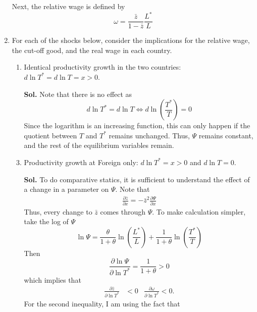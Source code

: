 \documentclass[12pt,oneside,reqno]{amsart}
\begin{document}
\begin{enumerate}[leftmargin=*]
\begin{equation}
    \end{equation}
    Next, the relative wage is defined by 
    \begin{equation}
        \omega = \frac{\bar{z}}{1-\bar{z}} \frac{L^*}{L}
    \end{equation}
    \item For each of the shocks below, consider the implications for the relative wage, the cut-off good, and the real wage in each country.
    \begin{enumerate}[leftmargin=*]
        \item Identical productivity growth in the two countries: $d \ln T^*=d \ln T=x>0$.
        \item[\textbf{Sol.}] Note that there is no effect as 
        \begin{equation*}
            d\ln T^*=d\ln T \Longleftrightarrow d\ln\left(\frac{T^*}{T}\right) = 0
        \end{equation*}
        Since the logarithm is an increasing function, this can only happen if the quotient between $T$ and $T^*$ remains unchanged. Thus, $\Psi$ remains constant, and the rest of the equilibrium variables remain.  
        \item Productivity growth at Foreign only: $d \ln T^*=x>0$ and $d \ln T=0$.
        \item[\textbf{Sol.}] To do comparative statics, it is sufficient to understand the effect of a change in a parameter on $\Psi$. Note that
        \begin{align*}
            \frac{\partial \bar{z}}{\partial x} = -\bar{z}^2\frac{\partial\Psi}{\partial x}
        \end{align*}
        Thus, every change to $\bar{z}$ comes through $\Psi$. To make calculation simpler, take the log of $\Psi$
        \begin{equation}\label{ps1:q1:lnPsi}
            \ln\Psi = \frac{\theta}{1+\theta}\ln\left(\frac{L^*}{L}\right) + \frac{1}{1+\theta}\ln\left(\frac{T^*}{T}\right)
        \end{equation}
        Then 
        \begin{equation*}
            \frac{\partial\ln\Psi}{\partial\ln T^*} = \frac{1}{1+\theta}>0
        \end{equation*}
        which implies that 
        \begin{align*}
            \frac{\partial \bar{z}}{\partial\ln T^*} &<0 & \frac{\partial \omega }{\partial \ln T^*} < 0. 
        \end{align*}
        For the second inequality, I am using the fact that 

\end{enumerate}
\end{enumerate}
\end{document}
